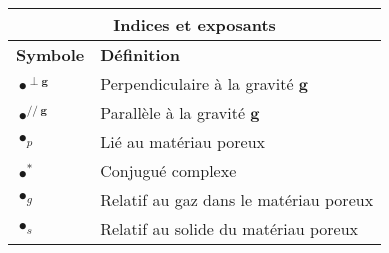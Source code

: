 \bigskip

\begin{center}
	\begin{tabular}{ll}
		\multicolumn{2}{c}{Indices et exposants}  \\\hline
		\textbf{Symbole} & \textbf{Définition} \\\hline\hline
		$\bullet^{\perp \mathbf g}$ & Perpendiculaire à la gravité $\mathbf g$ \\
		$\bullet^{//~\mathbf g}$ & Parallèle à la gravité $\mathbf g$ \\
		$\bullet_p$ & Lié au matériau poreux\\
		$\bullet^*$ & Conjugué complexe\\
		$\bullet_g$ & Relatif au gaz dans le matériau poreux\\
		$\bullet_s$ & Relatif au solide du matériau poreux
	\end{tabular}
\end{center}